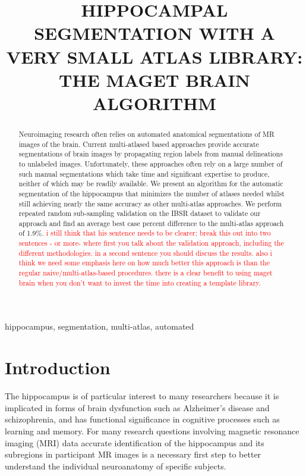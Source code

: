 \documentclass{article}
\title{HIPPOCAMPAL SEGMENTATION WITH A VERY SMALL ATLAS LIBRARY: THE MAGET
BRAIN ALGORITHM}
\newcommand{\todo}[1]{
    \textcolor{red}{#1}
}
\begin{document}

\maketitle       

\begin{abstract}
Neuroimaging research often relies on automated anatomical
segmentations of MR images of the brain. Current multi-atlased based
approaches provide accurate segmentations of brain images by
propagating region labels from manual delineations to unlabeled
images.  Unfortunately, these approaches often rely on a large number
of such manual segmentations which take time and significant expertise
to produce, neither of which may be readily available.  We present
an algorithm for the automatic segmentation of the hippocampus that
minimizes the number of atlases needed whilst still achieving nearly
the same accuracy as other multi-atlas approaches.  We perform
repeated random sub-sampling validation on the IBSR dataset to
validate our approach and find an average best case percent difference
to the multi-atlas approach of 1.9\%. \todo{i still think that his sentence
needs to be clearer; break this out into two sentences - or more- where
first you talk about the validation approach, including the different
methodologies.  in a second sentence you should discuss the results.  also
i think we need some emphasis here on how much better this approach is than
the regular naive/multi-atlas-based procedures.  there is a clear benefit to
using maget brain when you don't want to invest the time into creating a
template library.}

\end{abstract}

\begin{keywords}
hippocampus, segmentation, multi-atlas, automated
\end{keywords}

\section{Introduction}
\label{sec:intro}

The hippocampus is of particular interest to many researchers because it is
implicated in forms of brain dysfunction such as Alzheimer's disease and
schizophrenia, and has functional significance in cognitive processes such
as learning and memory.  For many research questions involving magnetic
resonance imaging (MRI) data accurate identification of the hippocampus and
its subregions in participant MR images is a necessary first step to better
understand the individual neuroanatomy of specific subjects.  
\end{document}

